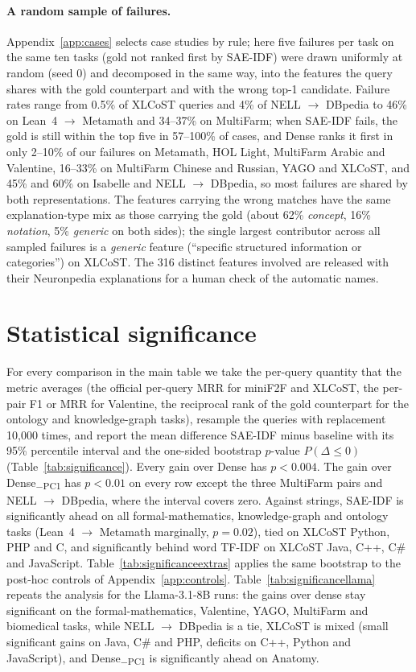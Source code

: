 \documentclass[11pt]{article}
\newcommand{\method}{SAE\mbox{-}IDF\xspace}
\newcommand{\pcone}{Dense\textsubscript{$-$PC1}\xspace}
\begin{document}
\paragraph{A random sample of failures.}
Appendix~\ref{app:cases} selects case studies by rule; here five failures per task on the same ten tasks (gold not ranked first by \method) were drawn uniformly at random (seed 0) and decomposed in the same way, into the features the query shares with the gold counterpart and with the wrong top-1 candidate.
Failure rates range from 0.5\% of XLCoST queries and 4\% of NELL $\to$ DBpedia to 46\% on Lean~4 $\to$ Metamath and 34--37\% on MultiFarm; when \method fails, the gold is still within the top five in 57--100\% of cases, and Dense ranks it first in only 2--10\% of our failures on Metamath, HOL Light, MultiFarm Arabic and Valentine, 16--33\% on MultiFarm Chinese and Russian, YAGO and XLCoST, and 45\% and 60\% on Isabelle and NELL $\to$ DBpedia, so most failures are shared by both representations.
The features carrying the wrong matches have the same explanation-type mix as those carrying the gold (about 62\% \emph{concept}, 16\% \emph{notation}, 5\% \emph{generic} on both sides); the single largest contributor across all sampled failures is a \emph{generic} feature (``specific structured information or categories'') on XLCoST.
The 316 distinct features involved are released with their Neuronpedia explanations for a human check of the automatic names.

\section{Statistical significance}
\label{app:significance}

For every comparison in the main table we take the per-query quantity that the metric averages (the official per-query MRR for miniF2F and XLCoST, the per-pair F1 or MRR for Valentine, the reciprocal rank of the gold counterpart for the ontology and knowledge-graph tasks), resample the queries with replacement 10,000 times, and report the mean difference \method minus baseline with its 95\% percentile interval and the one-sided bootstrap $p$-value $P(\Delta\le 0)$ (Table~\ref{tab:significance}).
Every gain over Dense has $p<0.004$.
The gain over \pcone has $p<0.01$ on every row except the three MultiFarm pairs and NELL $\to$ DBpedia, where the interval covers zero.
Against strings, \method is significantly ahead on all formal-mathematics, knowledge-graph and ontology tasks (Lean~4 $\to$ Metamath marginally, $p=0.02$), tied on XLCoST Python, PHP and C, and significantly behind word TF-IDF on XLCoST Java, C++, C\# and JavaScript.
Table~\ref{tab:significanceextras} applies the same bootstrap to the post-hoc controls of Appendix~\ref{app:controls}.
Table~\ref{tab:significancellama} repeats the analysis for the Llama-3.1-8B runs: the gains over dense stay significant on the formal-mathematics, Valentine, YAGO, MultiFarm and biomedical tasks, while NELL $\to$ DBpedia is a tie, XLCoST is mixed (small significant gains on Java, C\# and PHP, deficits on C++, Python and JavaScript), and \pcone is significantly ahead on Anatomy.
\end{document}
